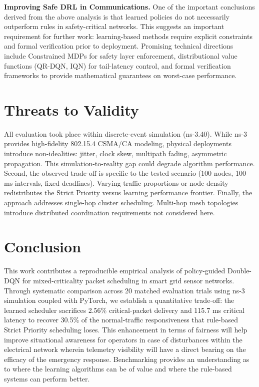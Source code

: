 \documentclass[runningheads]{llncs}
\begin{document}
\textbf{Improving Safe DRL in Communications.} One of the important conclusions derived from the above analysis is that learned policies do not necessarily outperform rules in safety-critical networks. This suggests an important requirement for further work: learning-based methods require explicit constraints and formal verification prior to deployment. Promising technical directions include Constrained MDPs for safety layer enforcement, distributional value functions (QR-DQN, IQN) for tail-latency control, and formal verification frameworks to provide mathematical guarantees on worst-case performance.

\section{Threats to Validity}
All evaluation took place within discrete-event simulation (ns-3.40). While ns-3 provides high-fidelity 802.15.4 CSMA/CA modeling, physical deployments introduce non-idealities: jitter, clock skew, multipath fading, asymmetric propagation. This simulation-to-reality gap could degrade algorithm performance. Second, the observed trade-off is specific to the tested scenario (100 nodes, 100 ms intervals, fixed deadlines). Varying traffic proportions or node density redistributes the Strict Priority versus learning performance frontier. Finally, the approach addresses single-hop cluster scheduling. Multi-hop mesh topologies introduce distributed coordination requirements not considered here.

\section{Conclusion}
This work contributes a reproducible empirical analysis of policy-guided Double-DQN for mixed-criticality packet scheduling in smart grid sensor networks. Through systematic comparison across 20 matched evaluation trials using ns-3 simulation coupled with PyTorch, we establish a quantitative trade-off: the learned scheduler sacrifices 2.56\% critical-packet delivery and 115.7 ms critical latency to recover 30.5\% of the normal-traffic responsiveness that rule-based Strict Priority scheduling loses. This enhancement in terms of fairness will help improve situational awareness for operators in case of disturbances within the electrical network wherein telemetry visibility will have a direct bearing on the efficacy of the emergency response. Benchmarking provides an understanding as to where the learning algorithms can be of value and where the rule-based systems can perform better.
\end{document}
